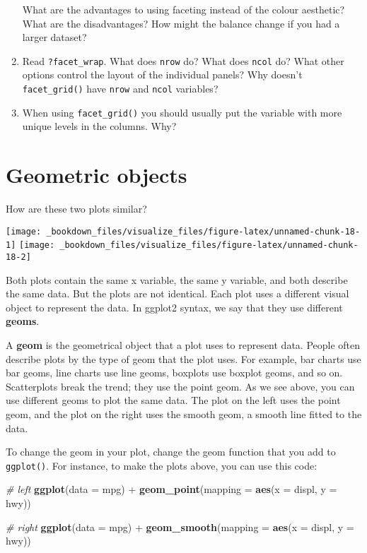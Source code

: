 \documentclass[]{book}
\newenvironment{Shaded}{\begin{snugshade}}{\end{snugshade}}
\newcommand{\KeywordTok}[1]{\textcolor[rgb]{0.13,0.29,0.53}{\textbf{{#1}}}}
\newcommand{\DataTypeTok}[1]{\textcolor[rgb]{0.13,0.29,0.53}{{#1}}}
\newcommand{\StringTok}[1]{\textcolor[rgb]{0.31,0.60,0.02}{{#1}}}
\newcommand{\CommentTok}[1]{\textcolor[rgb]{0.56,0.35,0.01}{\textit{{#1}}}}
\newcommand{\NormalTok}[1]{{#1}}
\begin{document}
\begin{enumerate}
  What are the advantages to using faceting instead of the colour
  aesthetic? What are the disadvantages? How might the balance change if
  you had a larger dataset?
\item
  Read \texttt{?facet\_wrap}. What does \texttt{nrow} do? What does
  \texttt{ncol} do? What other options control the layout of the
  individual panels? Why doesn't \texttt{facet\_grid()} have
  \texttt{nrow} and \texttt{ncol} variables?
\item
  When using \texttt{facet\_grid()} you should usually put the variable
  with more unique levels in the columns. Why?
\end{enumerate}

\section{Geometric objects}\label{geometric-objects}

How are these two plots similar?

\texttt{[image: \_bookdown\_files/visualize\_files/figure-latex/unnamed-chunk-18-1]}
\texttt{[image: \_bookdown\_files/visualize\_files/figure-latex/unnamed-chunk-18-2]}

Both plots contain the same x variable, the same y variable, and both
describe the same data. But the plots are not identical. Each plot uses
a different visual object to represent the data. In ggplot2 syntax, we
say that they use different \textbf{geoms}.

A \textbf{geom} is the geometrical object that a plot uses to represent
data. People often describe plots by the type of geom that the plot
uses. For example, bar charts use bar geoms, line charts use line geoms,
boxplots use boxplot geoms, and so on. Scatterplots break the trend;
they use the point geom. As we see above, you can use different geoms to
plot the same data. The plot on the left uses the point geom, and the
plot on the right uses the smooth geom, a smooth line fitted to the
data.

To change the geom in your plot, change the geom function that you add
to \texttt{ggplot()}. For instance, to make the plots above, you can use
this code:

\begin{Shaded}
\begin{Highlighting}[]
\CommentTok{# left}
\KeywordTok{ggplot}\NormalTok{(}\DataTypeTok{data =} \NormalTok{mpg) +}\StringTok{ }
\StringTok{  }\KeywordTok{geom_point}\NormalTok{(}\DataTypeTok{mapping =} \KeywordTok{aes}\NormalTok{(}\DataTypeTok{x =} \NormalTok{displ, }\DataTypeTok{y =} \NormalTok{hwy))}

\CommentTok{# right}
\KeywordTok{ggplot}\NormalTok{(}\DataTypeTok{data =} \NormalTok{mpg) +}\StringTok{ }
\StringTok{  }\KeywordTok{geom_smooth}\NormalTok{(}\DataTypeTok{mapping =} \KeywordTok{aes}\NormalTok{(}\DataTypeTok{x =} \NormalTok{displ, }\DataTypeTok{y =} \NormalTok{hwy))}
\end{Highlighting}
\end{Shaded}
\end{document}
